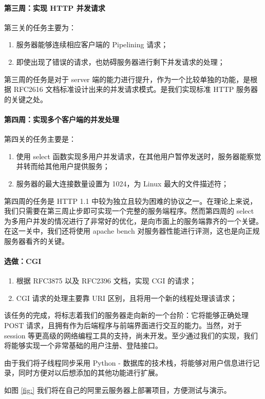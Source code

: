 \paragraph*{第三周：实现 HTTP 并发请求} 第三关的任务主要为：
\begin{enumerate}
    \item 服务器能够连续相应客户端的 Pipelining 请求； 
    \item 即使出现了错误的请求，也妨碍服务器进行剩下并发请求的处理；
\end{enumerate}

第三周的任务是对于 server 端的能力进行提升，作为一个比较单独的功能，是根据 RFC2616 文档标准设计出来的并发请求模式。是我们实现标准 HTTP 服务器的关键之处。

\paragraph*{第四周：实现多个客户端的并发处理} 第四关的任务主要是：
\begin{enumerate}
    \item 使用 select 函数实现多用户并发请求，在其他用户暂停发送时，服务器能察觉并转而给其他用户提供服务；
    \item 服务器的最大连接数量设置为 1024，为 Linux 最大的文件描述符；
\end{enumerate}

第四周的任务是 HTTP 1.1 中较为独立且较为困难的协议之一。在理论上来说，我们只需要在第三周止步即可实现一个完整的服务端程序。然而第四周的 select 为多用户并发的情况进行了非常好的优化，是向市面上的服务端靠齐的一个关键。在这一关中，我们还将使用 apache bench 对服务器性能进行评测，这也是向正规服务器看齐的关键。

\paragraph*{选做：CGI}
\begin{enumerate}
    \item 根据 RFC3875 以及 RFC2396 文档，实现 CGI 的请求；
    \item CGI 请求的处理主要靠 URI 区别，且将用一个新的线程处理该请求；
\end{enumerate}

该任务的完成，将标志着我们的服务器走向新的一个台阶：它将能够正确处理 POST 请求，且拥有作为后端程序与前端界面进行交互的能力。当然，对于 session 等更高级的网络编程工具的支持，尚未开发。至少通过我们的实现，我们将能够实现一个非常基础的用户注册、登陆接口。

由于我们将子线程同步采用 Python - 数据库的技术栈，将能够对用户信息进行记录，同时方便对以后想添加的其他功能进行扩展。

如图 \ref{fig:} 我们将在自己的阿里云服务器上部署项目，方便测试与演示。




